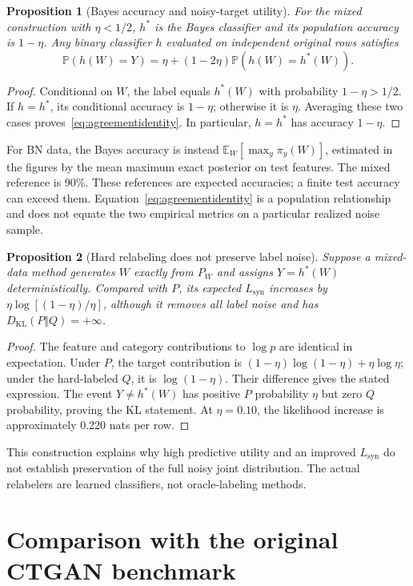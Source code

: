 \documentclass[11pt,letterpaper]{article}
\newcommand{\E}{\mathbb{E}}
\newcommand{\Prb}{\mathbb{P}}
\newcommand{\KL}{D_{\mathrm{KL}}}
\newcommand{\Lsyn}{L_{\mathrm{syn}}}
\newtheorem{proposition}{Proposition}
\begin{document}
\begin{proposition}[Bayes accuracy and noisy-target utility]
For the mixed construction with $\eta<1/2$, $h^*$ is the Bayes classifier and its population accuracy is $1-\eta$. Any binary classifier $h$ evaluated on independent original rows satisfies
\begin{equation}
 \Prb(h(W)=Y)=\eta+(1-2\eta)\Prb(h(W)=h^*(W)).
 \label{eq:agreementidentity}
\end{equation}
\end{proposition}
\begin{proof}
Conditional on $W$, the label equals $h^*(W)$ with probability $1-\eta>1/2$. If $h=h^*$, its conditional accuracy is $1-\eta$; otherwise it is $\eta$. Averaging these two cases proves~\eqref{eq:agreementidentity}. In particular, $h=h^*$ has accuracy $1-\eta$.
\end{proof}
For BN data, the Bayes accuracy is instead $\E_W[\max_y\pi_y(W)]$, estimated in the figures by the mean maximum exact posterior on test features. The mixed reference is 90\%. These references are expected accuracies; a finite test accuracy can exceed them. Equation~\eqref{eq:agreementidentity} is a population relationship and does not equate the two empirical metrics on a particular realized noise sample.

\begin{proposition}[Hard relabeling does not preserve label noise]
Suppose a mixed-data method generates $W$ exactly from $P_W$ and assigns $Y=h^*(W)$ deterministically. Compared with $P$, its expected $\Lsyn$ increases by $\eta\log[(1-\eta)/\eta]$, although it removes all label noise and has $\KL(P\Vert Q)=+\infty$.
\end{proposition}
\begin{proof}
The feature and category contributions to $\log p$ are identical in expectation. Under $P$, the target contribution is $(1-\eta)\log(1-\eta)+\eta\log\eta$; under the hard-labeled $Q$, it is $\log(1-\eta)$. Their difference gives the stated expression. The event $Y\ne h^*(W)$ has positive $P$ probability $\eta$ but zero $Q$ probability, proving the KL statement. At $\eta=0.10$, the likelihood increase is approximately 0.220 nats per row.
\end{proof}
This construction explains why high predictive utility and an improved $\Lsyn$ do not establish preservation of the full noisy joint distribution. The actual relabelers are learned classifiers, not oracle-labeling methods.

\section{Comparison with the original CTGAN benchmark}
\end{document}
